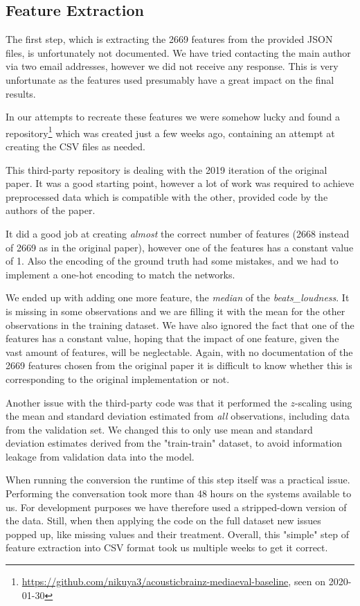 \documentclass[sigconf,nonacm]{acmart}
\begin{document}
\subsection{Feature Extraction}

The first step, which is extracting the 2669 features from the provided
JSON files, is unfortunately not documented.
We have tried contacting the main author via two email addresses,
however we did not receive any response.
This is very unfortunate as the features used presumably have a great
impact on the final results.

In our attempts to recreate these features
we were somehow lucky and found a
repository\footnote{\url{https://github.com/nikuya3/acousticbrainz-mediaeval-baseline}, seen on 2020-01-30}
which was created just a few weeks ago, containing an
attempt at creating the CSV files as needed.

This third-party repository is dealing with the 2019 iteration
of the original paper.
It was a good starting point, however a lot of
work was required to achieve preprocessed data which is
compatible with the other, provided code by the authors of the paper.

It did a good job at creating \emph{almost} the correct number
of features (2668 instead of 2669 as in the original paper),
however one of the features has a constant value of 1.
Also the encoding of the ground truth had some mistakes, and we
had to implement a one-hot encoding to match the networks.

We ended up with adding one more feature, the \emph{median}
of the \emph{beats\_loudness}.
It is missing in some observations and we are filling it with the mean
for the other observations in the training dataset.
We have also ignored the fact that one of the features has a constant value,
hoping that the impact of one feature, given the vast amount of features,
will be neglectable.
Again, with no documentation of the 2669 features chosen from the original
paper it is difficult to know whether this is corresponding to the
original implementation or not.

Another issue with the third-party code was that it performed the
$z$-scaling using the mean and standard deviation estimated
from \emph{all} observations,
including data from the validation set.
We changed this to only use mean and standard deviation estimates
derived from the "train-train" dataset, to avoid information
leakage from validation data into the model.

When running the conversion the runtime of this step itself was
a practical issue.
Performing the conversation took more than 48 hours on the systems
available to us.
For development purposes we have therefore used a stripped-down
version of the data.
Still, when then applying the code on the full dataset new
issues popped up, like missing values and their treatment.
Overall, this "simple" step of feature extraction into CSV
format took us multiple weeks to get it correct.
\end{document}
